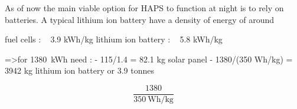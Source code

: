 As of now the main viable option for HAPS to function at night is to rely on batteries. A typical lithium ion battery have a density of energy of around 

fuel cells : ~ 3.9 kWh/kg
lithium ion battery : ~ 5.8 kWh/kg

=>for \SI{1380}{kWh} need :
-	115/1.4 = 82.1 kg solar panel
-	1380/(350 Wh/kg) = 3942 kg lithium ion battery or 3.9 tonnes

\begin{equation}
	\frac{1380}{\SI{350}{\watt\hour\per\kilogram}}
\end{equation}